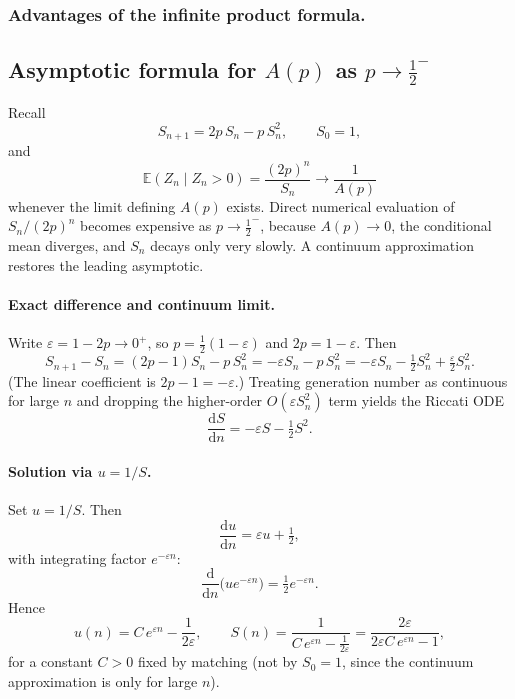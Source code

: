 \documentclass[11pt,a4paper]{article}
\theoremstyle{plain}
\theoremstyle{definition}
\begin{document}
\subsubsection{Advantages of the infinite product formula.}


\subsection{Asymptotic formula for $A(p)$ as $p\to\tfrac12^-$}

Recall
\[
S_{n+1}=2p\,S_n-p\,S_n^2,\qquad S_0=1,
\]
and
\[
\mathbb{E}(Z_n\mid Z_n>0)=\frac{(2p)^n}{S_n}\to\frac{1}{A(p)}
\]
whenever the limit defining $A(p)$ exists. Direct numerical evaluation of $S_n/(2p)^n$ becomes expensive as $p\to\tfrac12^-$, because $A(p)\to0$, the conditional mean diverges, and $S_n$ decays only very slowly. A continuum approximation restores the leading asymptotic.

\paragraph{Exact difference and continuum limit.}
Write $\varepsilon=1-2p\to0^+$, so $p=\tfrac12(1-\varepsilon)$ and $2p=1-\varepsilon$. Then
\begin{equation}
\label{eq:S-diff}
S_{n+1}-S_n
=
(2p-1)S_n-p\,S_n^2
=
-\varepsilon S_n-p\,S_n^2
=
-\varepsilon S_n-\tfrac12 S_n^2+\tfrac{\varepsilon}{2}S_n^2.
\end{equation}
(The linear coefficient is $2p-1=-\varepsilon$.) Treating generation number as continuous for large $n$ and dropping the higher-order $O(\varepsilon S_n^2)$ term yields the Riccati ODE
\begin{equation}
\label{eq:S-ode}
\frac{\mathrm{d}S}{\mathrm{d}n}
=
-\varepsilon S-\tfrac12 S^2.
\end{equation}

\paragraph{Solution via $u=1/S$.}
Set $u=1/S$. Then
\[
\frac{\mathrm{d}u}{\mathrm{d}n}
=
\varepsilon u+\tfrac12,
\]
with integrating factor $e^{-\varepsilon n}$:
\[
\frac{\mathrm{d}}{\mathrm{d}n}\bigl(u e^{-\varepsilon n}\bigr)
=
\tfrac12 e^{-\varepsilon n}.
\]
Hence
\[
u(n)
=
C\,e^{\varepsilon n}-\frac{1}{2\varepsilon},
\qquad
S(n)
=
\frac{1}{C\,e^{\varepsilon n}-\frac{1}{2\varepsilon}}
=
\frac{2\varepsilon}{2\varepsilon C\,e^{\varepsilon n}-1},
\]
for a constant $C>0$ fixed by matching (not by $S_0=1$, since the continuum approximation is only for large $n$).
\end{document}
